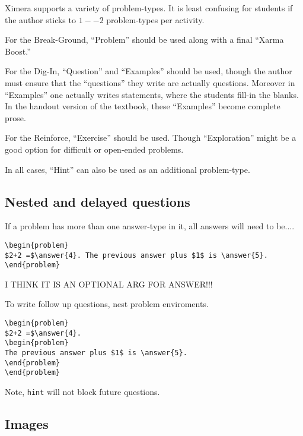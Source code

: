 \documentclass{article}
\begin{document}
Ximera supports a variety of problem-types. It is least confusing for
students if the author sticks to $1--2$ problem-types per activity.



For the Break-Ground, ``Problem'' should be used along with a final ``Xarma
Boost.''



For the Dig-In, ``Question'' and ``Examples'' should be used, though
the author must ensure that the ``questions'' they write are actually
questions. Moreover in ``Examples'' one actually writes statements,
where the students fill-in the blanks. In the handout version of the
textbook, these ``Examples'' become complete prose. 



For the Reinforce, ``Exercise'' should be used. Though ``Exploration''
might be a good option for difficult or open-ended problems.



In all cases, ``Hint'' can also be used as an additional problem-type.


\subsection*{Nested and delayed questions}


If a problem has more than one answer-type in it, all answers will
need to be....

\begin{verbatim}
\begin{problem}
$2+2 =$\answer{4}. The previous answer plus $1$ is \answer{5}.  
\end{problem}
\end{verbatim}

I THINK IT IS AN OPTIONAL ARG FOR ANSWER!!!


To write follow up questions, nest problem enviroments.

\begin{verbatim}
\begin{problem}
$2+2 =$\answer{4}. 
\begin{problem}
The previous answer plus $1$ is \answer{5}.  
\end{problem}
\end{problem}
\end{verbatim}
Note, \verb|hint| will not block future questions.



\subsection*{Images}
\end{document}
